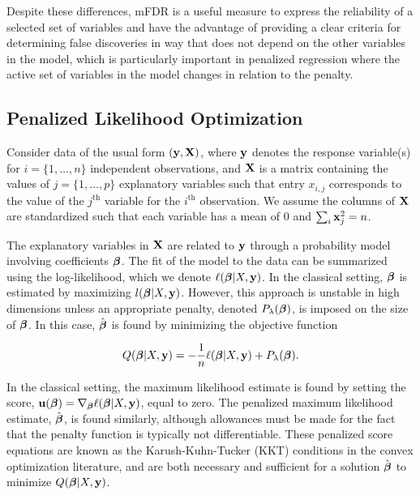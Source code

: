 Despite these differences, mFDR is a useful measure to express the reliability of a selected set of variables and have the advantage of providing a clear criteria for determining false discoveries in way that does not depend on the other variables in the model, which is particularly important in penalized regression where the active set of variables in the model changes in relation to the penalty.

\subsection{Penalized Likelihood Optimization}

Consider data of the usual form $(\mathbf{y}, \mathbf{X})$, where $\mathbf{y}$ denotes the response variable(s) for $i = \{1, \ldots, n\}$ independent observations, and $\mathbf{X}$ is a matrix containing the values of $j = \{1, \ldots, p\}$ explanatory variables such that entry $x_{i,j}$ corresponds to the value of the $j^{\textrm{th}}$ variable for the $i^{\textrm{th}}$ observation.  We assume the columns of $\mathbf{X}$ are standardized such that each variable has a mean of $0$ and $\sum_i \mathbf{x}_j^2 = n$.

The explanatory variables in $\mathbf{X}$ are related to $\mathbf{y}$ through a probability model involving coefficients $\boldsymbol{\beta}$.  The fit of the model to the data can be summarized using the log-likelihood, which we denote $\ell(\boldsymbol{\beta}|X,\mathbf{y})$.  In the classical setting, $\boldsymbol{\beta}$ is estimated by maximizing $l(\boldsymbol{\beta}|X,\mathbf{y})$.  However, this approach is unstable in high dimensions unless an appropriate penalty, denoted $P_{\lambda}(\boldsymbol{\beta})$, is imposed on the size of $\boldsymbol{\beta}$.
In this case, $\hat{\boldsymbol{\beta}}$ is found by minimizing the objective function

\begin{equation*}
 Q(\boldsymbol{\beta}|X,\mathbf{y}) =  -\frac{1}{n} \ell(\boldsymbol{\beta}|X,\mathbf{y}) + P_{\lambda} (\boldsymbol{\beta}).
\end{equation*}

In the classical setting, the maximum likelihood estimate is found by setting the score, $\mathbf{u}(\boldsymbol{\beta}) = \nabla_{\boldsymbol{\beta}} \ell(\boldsymbol{\beta}|X,\mathbf{y})$, equal to zero.  The penalized maximum likelihood estimate, $\hat{\boldsymbol{\beta}}$, is found similarly, although allowances must be made for the fact that the penalty function is typically not differentiable.  These penalized score equations are known as the Karush-Kuhn-Tucker (KKT) conditions in the convex optimization literature, and are both necessary and sufficient for a solution $\hat{\boldsymbol{\beta}}$ to minimize $Q(\boldsymbol{\beta}|X,\mathbf{y})$.

